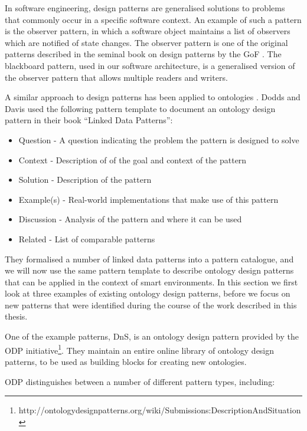 In software engineering, design patterns are generalised solutions to problems that commonly occur in a specific software context. An example of such a pattern is the observer pattern, in which a software object maintains a list of observers which are notified of state changes. The observer pattern is one of the original patterns described in the seminal book on design patterns by the \ac{GoF} \cite{Gamma1994}.  The blackboard pattern, used in our software architecture, is a generalised version of the observer pattern that allows multiple readers and writers. 

A similar approach to design patterns has been applied to ontologies \cite{Gangemi2008, Hoekstra2009, Dodds2011}. Dodds and Davis \cite{Dodds2011} used the following pattern template to document an ontology design pattern in their book ``Linked Data Patterns'':

\begin{itemize}
	\item Question - A question indicating the problem the pattern is designed to solve
	\item Context - Description of of the goal and context of the pattern
	\item Solution - Description of the pattern
	\item Example(s) - Real-world implementations that make use of this pattern
	\item Discussion - Analysis of the pattern and where it can be used
	\item Related - List of comparable patterns
\end{itemize}

They formalised a number of linked data patterns into a pattern catalogue, and we will now use the same pattern template to describe ontology design patterns that can be applied in the context of smart environments. In this section we first look at three examples of existing ontology design patterns, before we focus on new patterns that were identified during the course of the work described in this thesis.

One of the example patterns, \ac{DnS}, is an ontology design pattern provided by the \ac{ODP} initiative\footnote{http://ontologydesignpatterns.org/wiki/Submissions:DescriptionAndSituation}. They maintain an entire online library of ontology design patterns, to be used as building blocks for creating new ontologies. 

\ac{ODP} distinguishes between a number of different pattern types, including:

